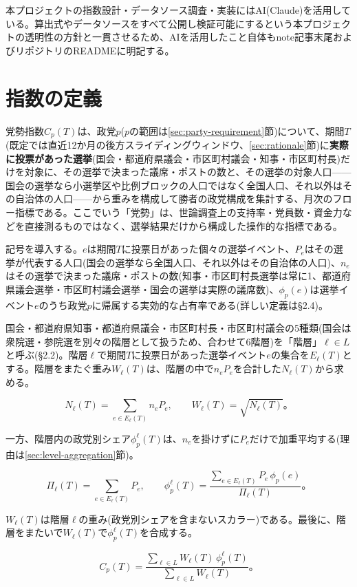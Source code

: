 \documentclass[a4paper,11pt]{ltjsarticle}
\begin{document}
本プロジェクトの指数設計・データソース調査・実装にはAI(Claude)を活用している。算出式やデータソースをすべて公開し検証可能にするという本プロジェクトの透明性の方針と一貫させるため、AIを活用したこと自体もnote記事末尾およびリポジトリのREADMEに明記する。

\section{指数の定義}

党勢指数$C_p(T)$は、政党$p$($p$の範囲は\ref{sec:party-requirement}節)について、期間$T$(既定では直近12か月の後方スライディングウィンドウ、\ref{sec:rationale}節)に\textbf{実際に投票があった選挙}(国会・都道府県議会・市区町村議会・知事・市区町村長)だけを対象に、その選挙で決まった議席・ポストの数と、その選挙の対象人口——国会の選挙なら小選挙区や比例ブロックの人口ではなく全国人口、それ以外はその自治体の人口——から重みを構成して勝者の政党構成を集計する、月次のフロー指標である。ここでいう「党勢」は、世論調査上の支持率・党員数・資金力などを直接測るものではなく、選挙結果だけから構成した操作的な指標である。

記号を導入する。$e$は期間$T$に投票日があった個々の選挙イベント、$P_e$はその選挙が代表する人口(国会の選挙なら全国人口、それ以外はその自治体の人口)、$n_e$はその選挙で決まった議席・ポストの数(知事・市区町村長選挙は常に1、都道府県議会選挙・市区町村議会選挙・国会の選挙は実際の議席数)、$\phi_p(e)$は選挙イベント$e$のうち政党$p$に帰属する実効的な占有率である(詳しい定義は\S2.4)。

国会・都道府県知事・都道府県議会・市区町村長・市区町村議会の5種類(国会は衆院選・参院選を別々の階層として扱うため、合わせて6階層)を「階層」$\ell\in L$と呼ぶ(\S2.2)。階層$\ell$で期間$T$に投票日があった選挙イベント$e$の集合を$E_\ell(T)$とする。階層をまたぐ重み$W_\ell(T)$は、階層の中で$n_eP_e$を合計した$N_\ell(T)$から求める。

\[
N_\ell(T) = \sum_{e\in E_\ell(T)} n_eP_e, \qquad
W_\ell(T) = \sqrt{N_\ell(T)}。
\]

一方、階層内の政党別シェア$\phi_p^\ell(T)$は、$n_e$を掛けずに$P_e$だけで加重平均する(理由は\ref{sec:level-aggregation}節)。

\[
\Pi_\ell(T) = \sum_{e\in E_\ell(T)} P_e, \qquad
\phi_p^\ell(T) = \frac{\displaystyle\sum_{e\in E_\ell(T)} P_e\,\phi_p(e)}{\Pi_\ell(T)}。
\]

$W_\ell(T)$は階層$\ell$の重み(政党別シェアを含まないスカラー)である。最後に、階層をまたいで$W_\ell(T)$で$\phi_p^\ell(T)$を合成する。

\[
C_p(T) = \frac{\displaystyle\sum_{\ell\in L} W_\ell(T)\,\phi_p^\ell(T)}
               {\displaystyle\sum_{\ell\in L} W_\ell(T)}。
\]
\end{document}
